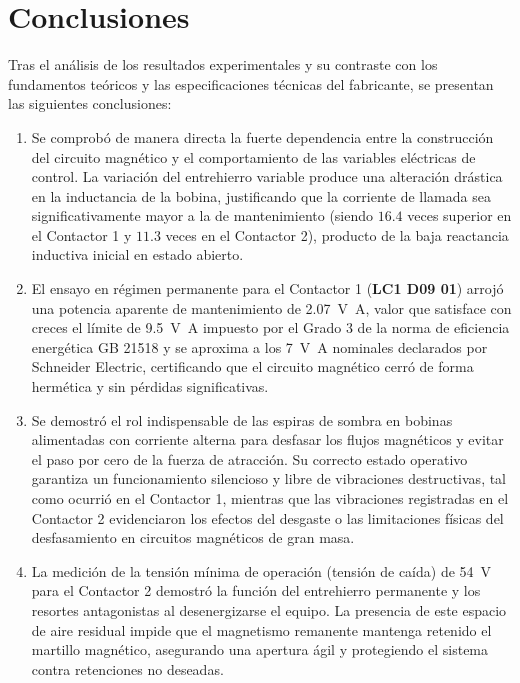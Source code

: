 \section{Conclusiones}

Tras el análisis de los resultados experimentales y su contraste con los fundamentos teóricos y las especificaciones técnicas del fabricante, se presentan las siguientes conclusiones:

\begin{enumerate}
    \item Se comprobó de manera directa la fuerte dependencia entre la construcción del circuito magnético y el comportamiento de las variables eléctricas de control. La variación del entrehierro variable produce una alteración drástica en la inductancia de la bobina, justificando que la corriente de llamada sea significativamente mayor a la de mantenimiento (siendo $\num{16,4}$ veces superior en el Contactor 1 y $\num{11,3}$ veces en el Contactor 2), producto de la baja reactancia inductiva inicial en estado abierto.
    
    \item El ensayo en régimen permanente para el Contactor 1 (\textbf{LC1 D09 01}) arrojó una potencia aparente de mantenimiento de \qty{2,07}{\volt\ampere}, valor que satisface con creces el límite de \qty{9,5}{\volt\ampere} impuesto por el Grado 3 de la norma de eficiencia energética GB 21518 y se aproxima a los \qty{7}{\volt\ampere} nominales declarados por Schneider Electric, certificando que el circuito magnético cerró de forma hermética y sin pérdidas significativas.
    
    \item Se demostró el rol indispensable de las espiras de sombra en bobinas alimentadas con corriente alterna para desfasar los flujos magnéticos y evitar el paso por cero de la fuerza de atracción. Su correcto estado operativo garantiza un funcionamiento silencioso y libre de vibraciones destructivas, tal como ocurrió en el Contactor 1, mientras que las vibraciones registradas en el Contactor 2 evidenciaron los efectos del desgaste o las limitaciones físicas del desfasamiento en circuitos magnéticos de gran masa.
    
    \item La medición de la tensión mínima de operación (tensión de caída) de \qty{54}{\volt} para el Contactor 2 demostró la función del entrehierro permanente y los resortes antagonistas al desenergizarse el equipo. La presencia de este espacio de aire residual impide que el magnetismo remanente mantenga retenido el martillo magnético, asegurando una apertura ágil y protegiendo el sistema contra retenciones no deseadas.
    

\end{enumerate}
